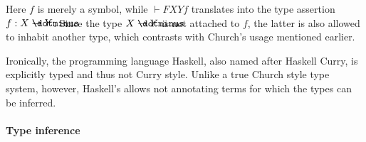 \begin{remark}
  Here \( f \) is merely a symbol, while \( \vdash FXYf \) translates into the type assertion \( f: X \synimplies Y \). Since the type \( X \synimplies Y \) is not attached to \( f \), the latter is also allowed to inhabit another type, which contrasts with Church's usage mentioned earlier.

  Ironically, the programming language Haskell, also named after Haskell Curry, is explicitly typed and thus not Curry style. Unlike a true Church style type system, however, Haskell's allows not annotating terms for which the types can be inferred.
\end{remark}

\paragraph{Type inference}


